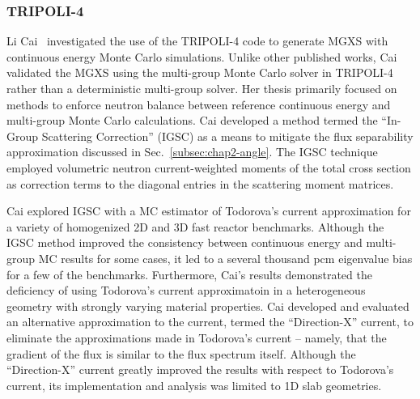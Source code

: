 \subsubsection{TRIPOLI-4}
\label{subsec:chap3-lit-review-transport-tripoli}

Li Cai~\cite{cai2014condensation} investigated the use of the TRIPOLI-4 code to generate \ac{MGXS} with continuous energy Monte Carlo simulations. Unlike other published works, Cai validated the \ac{MGXS} using the multi-group Monte Carlo solver in TRIPOLI-4 rather than a deterministic multi-group solver. Her thesis primarily focused on methods to enforce neutron balance between reference continuous energy and multi-group Monte Carlo calculations. Cai developed a method termed the ``In-Group Scattering Correction'' (IGSC) as a means to mitigate the flux separability approximation discussed in Sec.~\ref{subsec:chap2-angle}. The IGSC technique employed volumetric neutron current-weighted moments of the total cross section as correction terms to the diagonal entries in the scattering moment matrices. 


Cai explored IGSC with a \ac{MC} estimator of Todorova's current approximation for a variety of homogenized 2D and 3D fast reactor benchmarks. Although the IGSC method improved the consistency between continuous energy and multi-group \ac{MC} results for some cases, it led to a several thousand \ac{pcm} eigenvalue bias for a few of the benchmarks. Furthermore, Cai's results demonstrated the deficiency of using Todorova's current approximatoin in a heterogeneous geometry with strongly varying material properties. Cai developed and evaluated an alternative approximation to the current, termed the ``Direction-X'' current, to eliminate the approximations made in Todorova's current -- namely, that the gradient of the flux is similar to the flux spectrum itself. Although the ``Direction-X'' current greatly improved the results with respect to Todorova's current, its implementation and analysis was limited to 1D slab geometries.


